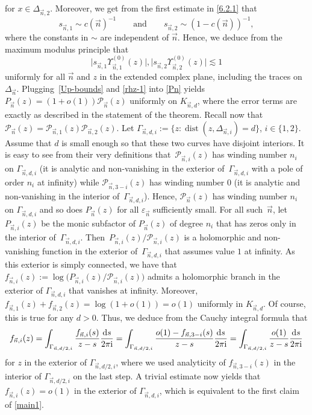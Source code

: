 \documentclass[10pt,a4paper]{amsart}
\numberwithin{equation}{section}
\newcommand{\dist}{\operatorname{dist}}
\newcommand{\n}{{\vec n}}
\newcommand{\ic}{\mathrm{i}}
\begin{document}
for $ x\in \Delta_{\n,2} $. Moreover, we get from the first estimate in \eqref{6.2.1} that
\begin{equation}
\label{est_sni}
s_{\n,1} \sim c(\n)^{-1} \qquad \text{and}\qquad  s_{\n,2} \sim (1-c(\n))^{-1},
\end{equation}
where the constants in $ \sim $ are independent of $ \n $. Hence, we deduce from the maximum modulus principle that
\begin{equation}
\label{Up-bounds}
\big|s_{\n,1}\Upsilon_{\n,1}^{(0)}(z)\big|, \big|s_{\n,2}\Upsilon_{\n,2}^{(0)}(z)\big| \lesssim 1
\end{equation}
uniformly for all $ \n $ and $ z $ in the extended complex plane, including the traces on $ \Delta_\n $. Plugging~\eqref{Up-bounds} and \eqref{rhz-1} into \eqref{Pn} yields
$
P_\n(z) = (1+o(1)) \mathcal P_\n(z)
$
uniformly on $ K_{\n,d} $, where the error terms are exactly as described in the statement of the theorem. Recall now that $ \mathcal P_\n(z) = \mathcal P_{\n,1}(z)\mathcal P_{\n,2}(z) $. Let $ \Gamma_{\n,d,i}:= \{ z : \dist(z,\Delta_{\n,i}) = d \} $, ${ i\in\{1,2\} }$. Assume that $ d $ is small enough so that these two curves have disjoint interiors. It is easy to see from their very definitions that~$ \mathcal P_{\n,i}(z) $ has winding number $ n_i $ on $ \Gamma_{\n,d,i} $ (it is analytic and non-vanishing in the exterior of~$ \Gamma_{\n,d,i} $ with a pole of order $ n_i $ at infinity) while $ \mathcal P_{\n,3-i}(z) $ has winding number $ 0 $ (it is analytic and non-vanishing in the interior of~$ \Gamma_{\n,d,i} $). Hence, $ \mathcal P_\n(z) $ has winding number $ n_i $ on $ \Gamma_{\n,d,i} $ and so does $ P_\n(z) $ for all $ \varepsilon_\n $ sufficiently small. For all such~$ \n $, let~$ P_{\n,i}(z) $ be the monic subfactor of $ P_\n(z) $ of degree $ n_i $ that has zeros only in the interior of~$ \Gamma_{\n,d,i} $. Then~${ P_{\n,i}(z)/\mathcal P_{\n,i}(z) }$ is a holomorphic and non-vanishing function in the exterior of~$ \Gamma_{\n,d,i} $ that assumes value $ 1 $ at infinity. As this exterior is simply connected, we have that
$
f_{\n,i}(z) := \log \bigl( P_{\n,i}(z)/\mathcal P_{\n,i}(z) \bigr)
$
admits a holomorphic branch in the exterior of $ \Gamma_{\n,d,i} $ that vanishes at infinity. Moreover, $ f_{\n,1}(z) + f_{\n,2}(z) = \log(1+o(1)) = o(1) $ uniformly in $ K_{\n,d} $. Of course, this is true for any $ d>0 $. Thus, we deduce from the Cauchy integral formula that
\[
f_{\n,i}(z) = \int_{\Gamma_{\n,d/2,i}} \frac{f_{\n,i}(s)}{z-s}\frac{{\rm d}s}{2\pi\ic} = \int_{\Gamma_{\n,d/2,i}} \frac{o(1) - f_{\n,3-i}(s)}{z-s}\frac{{\rm d}s}{2\pi\ic} = \int_{\Gamma_{\n,d/2,i}} \frac{o(1)}{z-s}\frac{{\rm d}s}{2\pi\ic}
\]
for $ z $ in the exterior of $ \Gamma_{\n,d/2,i} $, where we used analyticity of $ f_{\n,3-i}(z) $ in the interior of $ \Gamma_{\n,d/2,i} $ on the last step. A trivial estimate now yields that $ f_{\n,i}(z) = o(1) $ in the exterior of $ \Gamma_{\n,d,i} $, which is equivalent to the first claim of \eqref{main1}.
\end{document}
